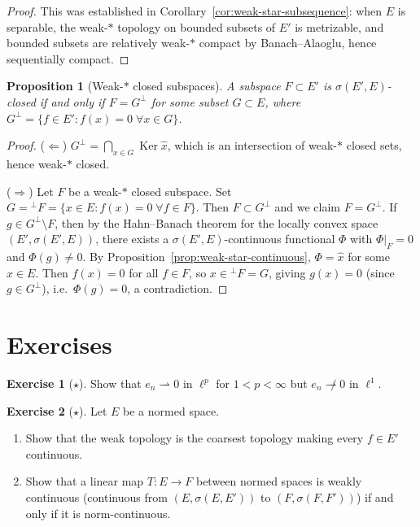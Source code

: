 \documentclass[a4paper,12pt]{book}
\DeclareMathOperator{\Ker}{Ker}
\newcommand{\weakto}{\rightharpoonup}
\theoremstyle{definition}
\newtheorem{exercise}{Exercise}[chapter]
\theoremstyle{plain}
\newtheorem{proposition}[definition]{Proposition}
\theoremstyle{remark}
\begin{document}
\begin{proof}
This was established in Corollary~\ref{cor:weak-star-subsequence}: when $E$ is
separable, the weak-$*$ topology on bounded subsets of $E'$ is metrizable,
and bounded subsets are relatively weak-$*$ compact by Banach--Alaoglu, hence
sequentially compact.
\end{proof}

\begin{proposition}[Weak-$*$ closed subspaces]\label{prop:wstar-closed-subspace}
A subspace $F\subset E'$ is $\sigma(E',E)$-closed if and only if
$F = G^\perp$ for some subset $G\subset E$, where
$G^\perp = \{f\in E': f(x)=0\;\forall x\in G\}$.
\end{proposition}

\begin{proof}
($\Leftarrow$) $G^\perp = \bigcap_{x\in G}\Ker\hat{x}$, which is an
intersection of weak-$*$ closed sets, hence weak-$*$ closed.

($\Rightarrow$) Let $F$ be a weak-$*$ closed subspace.  Set
$G = {}^\perp F = \{x\in E: f(x)=0\;\forall f\in F\}$.  Then $F\subset G^\perp$
and we claim $F = G^\perp$.  If $g\in G^\perp\setminus F$, then by the Hahn--Banach
theorem for the locally convex space $(E',\sigma(E',E))$, there exists a
$\sigma(E',E)$-continuous functional $\Phi$ with $\Phi\big|_F=0$ and $\Phi(g)\ne 0$.
By Proposition~\ref{prop:weak-star-continuous}, $\Phi = \hat{x}$ for some
$x\in E$.  Then $f(x)=0$ for all $f\in F$, so $x\in{}^\perp F = G$, giving
$g(x)=0$ (since $g\in G^\perp$), i.e.\ $\Phi(g)=0$, a contradiction.
\end{proof}

\section{Exercises}\label{sec:exercises-weak-topologies}

\begin{exercise}[$\star$]\label{exo:weak-convergence-lp}
Show that $e_n\weakto 0$ in $\ell^p$ for $1<p<\infty$ but $e_n\not\weakto 0$
in $\ell^1$.
\end{exercise}

\begin{exercise}[$\star$]\label{exo:weak-topology-subbase}
Let $E$ be a normed space.
\begin{enumerate}[label=(\alph*)]
  \item Show that the weak topology is the coarsest topology making every
        $f\in E'$ continuous.
  \item Show that a linear map $T:E\to F$ between normed spaces is
        weakly continuous (continuous from $(E,\sigma(E,E'))$ to $(F,\sigma(F,F'))$)
        if and only if it is norm-continuous.
\end{enumerate}
\end{exercise}
\end{document}
